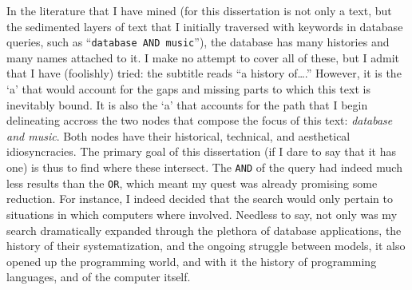In the literature that I have mined (for this dissertation is not only a text, but the sedimented layers of text that I initially traversed with keywords in database queries, such as ``\texttt{database AND music}''), the database has many histories and many names attached to it. I make no attempt to cover all of these, but I admit that I have (foolishly) tried: the subtitle reads ``a history of\dots.'' However, it is the `a' that would account for the gaps and missing parts to which this text is inevitably bound. It is also the `a' that accounts for the path that I begin delineating accross the two nodes that compose the focus of this text: \textit{database and music}. Both nodes have their historical, technical, and aesthetical idiosyncracies. The primary goal of this dissertation (if I dare to say that it has one) is thus to find where these intersect. The \texttt{AND} of the query had indeed much less results than the \texttt{OR}, which meant my quest was already promising some reduction. For instance, I indeed decided that the search would only pertain to situations in which computers where involved. Needless to say, not only was my search dramatically expanded through the plethora of database applications, the history of their systematization, and the ongoing struggle between models, it also opened up the programming world, and with it the history of programming languages, and of the computer itself. 

